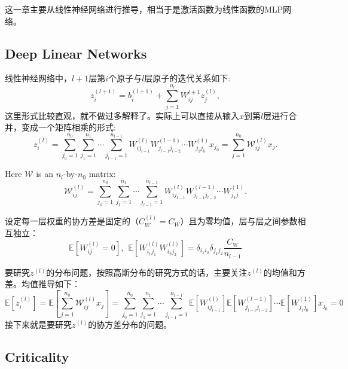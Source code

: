 这一章主要从线性神经网络进行推导，相当于是激活函数为线性函数的MLP网络。

\subsection{Deep Linear Networks}

线性神经网络中，$l+1$层第$i$个原子与$l$层原子的迭代关系如下:
\begin{equation}
    z_{i}^{(l+1)} = b_i^{(l+1)} + \sum_{j=1}^{n_l} W_{ij}^{l+1}z_{j}^{(l)},
\end{equation}
这里形式比较直观，就不做过多解释了。实际上可以直接从输入$x$到第$l$层进行合并，变成一个矩阵相乘的形式:
\begin{equation}
    z_i^{(l)} = \sum_{j_0=1}^{n_0}\sum_{j_1=1}^{n_1} \cdots \sum_{j_{l-1}=1}^{n_{l-1}}
                W_{ij_{l-1}}^{(l)} W_{j_{l-1}j_{l-2}}^{(l-1)} \cdots W_{j_1j_0}^{(1)} x_{j_0}
              = \sum_{j=1}^{n_0} \mathcal{W}_{ij}^{(l)} x_j.
\end{equation}

Here $\mathcal{W}$ is an $n_l$-by-$n_0$ matrix:
\begin{equation}
    \mathcal{W}_{ij}^{(l)} = \sum_{j_0=1}^{n_0}\sum_{j_1=1}^{n_1} \cdots \sum_{j_{l-1}=1}^{n_{l-1}}
                W_{ij_{l-1}}^{(l)} W_{j_{l-1}j_{l-2}}^{(l-1)} \cdots W_{j_1j}^{(1)}.
\end{equation}

设定每一层权重的协方差是固定的（$C_W^{(l)} = C_W$）且为零均值，层与层之间参数相互独立：
\begin{equation}
   \mathbb{E}[W_{ij}^{(l)} = 0], ~~ \mathbb{E}[W_{i_1j_1}^{(l)}W_{i_2j_2}^{(l)}] 
                                    = \delta_{i_1i_2}\delta_{j_1j_2}\frac{C_W}{n_{l-1}}
\end{equation}

要研究$z^{(l)}$的分布问题，按照高斯分布的研究方式的话，主要关注$z^{(l)}$的均值和方差。均值推导如下：
\begin{equation}
    \mathbb{E}[z_i^{(l)}] = \mathbb{E}[\sum_{j=1}^{n_0} \mathcal{W}_{ij}^{(l)} x_j]
     = \sum_{j_0=1}^{n_0}\sum_{j_1=1}^{n_1} \cdots \sum_{j_{l-1}=1}^{n_{l-1}}
       \mathbb{E}[W_{ij_{l-1}}^{(l)}] \mathbb{E}[W_{j_{l-1}j_{l-2}}^{(l-1)}]
       \cdots \mathbb{E}[W_{j_1j_0}^{(1)}] x_{j_0} = 0
\end{equation}
接下来就是要研究$z^{(l)}$的协方差分布的问题。

\subsection{Criticality}
